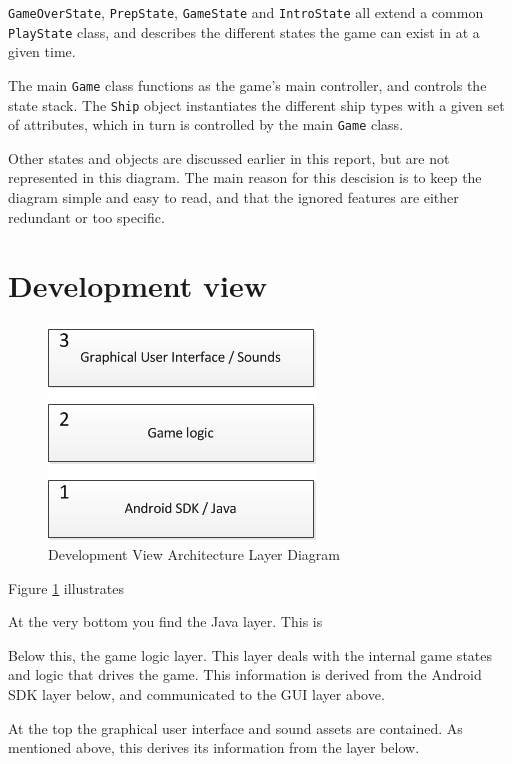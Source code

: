 \texttt{GameOverState}, \texttt{PrepState}, \texttt{GameState} and \texttt{IntroState} all extend a common \texttt{PlayState} class, and describes the different states the game can exist in at a given time.

The main \texttt{Game} class functions as the game's main controller, and controls the state stack. The \texttt{Ship} object instantiates the different ship types with a given set of attributes, which in turn is controlled by the main \texttt{Game} class.

Other states and objects are discussed earlier in this report, but are not represented in this diagram. The main reason for this descision is to keep the diagram simple and easy to read, and that the ignored features are either redundant or too specific.



\section{Development view}


\begin{figure}[ht]
    \includegraphics{DevelopmentView.png}
    \caption{Development View Architecture Layer Diagram}
    \label{fig:DevelopmentView}
\end{figure}

Figure \ref{fig:DevelopmentView} illustrates 


At the very bottom you find the Java layer. This is 


Below this, the game logic layer. This layer deals with the internal game states and logic that drives the game. This information is derived from the Android SDK layer below, and communicated to the GUI layer above.


At the top the graphical user interface and sound assets are contained. As mentioned above, this derives its information from the layer below.

